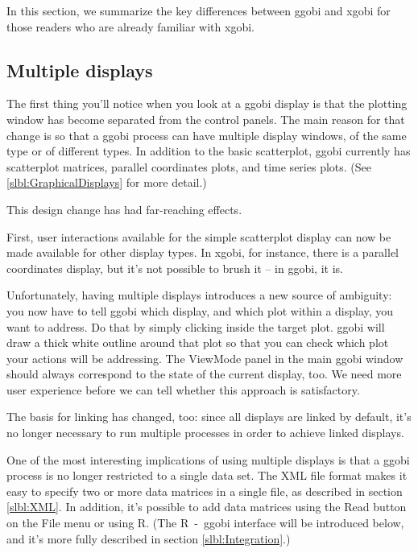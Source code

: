 \documentclass[11pt]{article}
\begin{document}
In this section, we summarize the key differences between ggobi
and xgobi for those readers who are already familiar with xgobi.

\subsection {Multiple displays}

The first thing you'll notice when you look at a ggobi display is
that the plotting window has become separated from the control
panels.  The main reason for that change is so that a ggobi process
can have multiple display windows, of the same type or of different
types.  In addition to the basic scatterplot, ggobi currently has
scatterplot matrices, parallel coordinates plots, and time series
plots.  (See \ref{slbl:GraphicalDisplays} for more detail.)

This design change has had far-reaching effects.

First, user interactions available for the simple scatterplot display
can now be made available for other display types.  In xgobi, for
instance, there is a parallel coordinates display, but it's not
possible to brush it -- in ggobi, it is. 

Unfortunately, having multiple displays introduces a new source of
ambiguity: you now have to tell ggobi which display, and which plot
within a display, you want to address.  Do that by simply clicking
inside the target plot.  ggobi will draw a thick white outline around
that plot so that you can check which plot your actions will be
addressing.  The ViewMode panel in the main ggobi window should
always correspond to the state of the current display, too.  We need
more user experience before we can tell whether this approach is
satisfactory.

The basis for linking has changed, too:  since all displays are
linked by default, it's no longer necessary to run multiple processes
in order to achieve linked displays.

One of the most interesting implications of using multiple displays
is that a ggobi process is no longer restricted to a single data
set.  The XML file format makes it easy to specify two or more data
matrices in a single file, as described in section \ref{slbl:XML}.
In addition, it's possible to add data matrices using the Read button
on the File menu or using R.  (The R~-~ggobi interface will be
introduced below, and it's more fully described in section
\ref{slbl:Integration}.)
\end{document}
